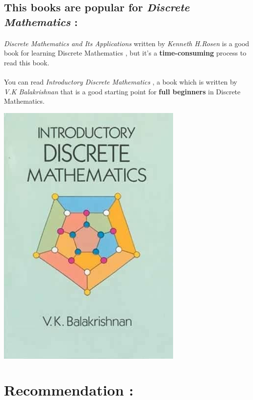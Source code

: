 \documentclass[12pt, a4paper]{article}
\begin{document}
\subsection*{This books are popular for \emph{Discrete Mathematics} :}
\paragraph{}
\emph{Discrete Mathematics and Its Applications} written by \emph{Kenneth H.Rosen} is a good book for learning Discrete Mathematics , but it's a \textbf{time-consuming} process to read this book.
\paragraph{} 
You can read \emph{Introductory Discrete Mathematics} , a book which is written by \emph{V.K Balakrishnan} that is a good starting point for \textbf{full beginners} in Discrete Mathematics.\\

\begin{center}
	\includegraphics[scale=0.5]{IDM.jpg}
\end{center}


\newpage
\section*{Recommendation :}
\end{document}
